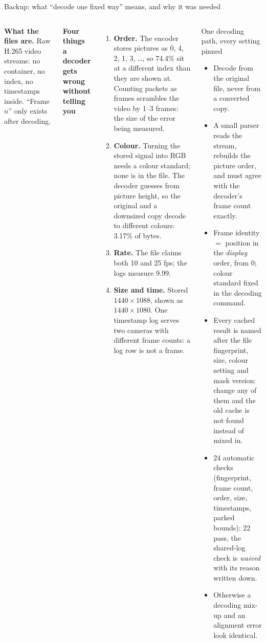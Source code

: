 \documentclass[10pt,aspectratio=169]{beamer}
\begin{document}
\begin{frame}{Backup: what ``decode one fixed way'' means, and why it was needed}
\scriptsize
\begin{columns}[T]
\textbf{What the files are.} Raw H.265 video streams: no container, no index, no timestamps inside. ``Frame $n$'' only exists after decoding.

\vspace{2pt}
\textbf{Four things a decoder gets wrong without telling you}
\begin{enumerate}
  \item \textbf{Order.} The encoder stores pictures as 0, 4, 2, 1, 3, \dots, so 74.4\% sit at a different index than they are shown at. Counting packets as frames scrambles the video by 1--3 frames: the size of the error being measured.
  \item \textbf{Colour.} Turning the stored signal into RGB needs a colour standard; none is in the file. The decoder guesses from picture height, so the original and a downsized copy decode to different colours: 3.17\% of bytes.
  \item \textbf{Rate.} The file claims both 10 and 25 fps; the logs measure 9.99.
  \item \textbf{Size and time.} Stored $1440\times1088$, shown as $1440\times1080$. One timestamp log serves two cameras with different frame counts: a log row is not a frame.
\end{enumerate}
\begin{block}{One decoding path, every setting pinned}
\begin{itemize}
  \item Decode from the original file, never from a converted copy.
  \item A small parser reads the stream, rebuilds the picture order, and must agree with the decoder's frame count exactly.
  \item Frame identity $=$ position in the \emph{display} order, from 0; colour standard fixed in the decoding command.
  \item Every cached result is named after the file fingerprint, size, colour setting and mask version: change any of them and the old cache is not found instead of mixed in.
  \item 24 automatic checks (fingerprint, frame count, order, size, timestamps, parked bounds): 22 pass, the shared-log check is \emph{waived} with its reason written down.
  \item Otherwise a decoding mix-up and an alignment error look identical.
\end{itemize}
\end{block}
\end{columns}
\end{frame}
\end{document}
